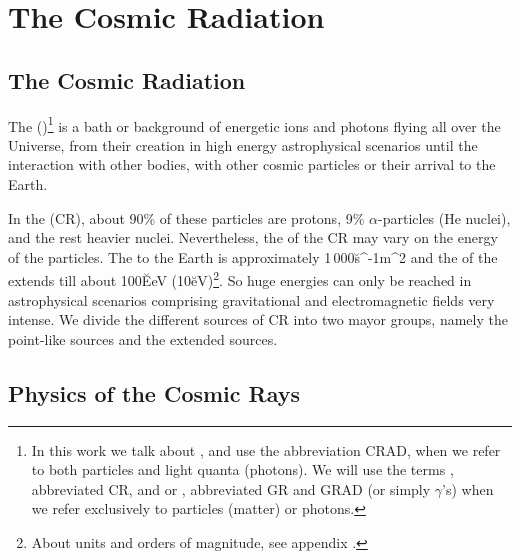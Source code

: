 

\chapter{The Cosmic Radiation}
\label{chapter:cosmicrad}
\let\rightmark\leftmark

\section{The Cosmic Radiation}

The \emph{} ()\footnote{In this work we
  talk about \emph{}, and use the abbreviation
  CRAD, when we refer to both particles and light quanta (photons). We
  will use the terms \emph{}, abbreviated CR, and
  \emph{} or \emph{}, abbreviated GR
  and GRAD (or simply $\gamma$'s) when we refer exclusively to
  particles (matter) or photons.}  is a bath or background of
energetic ions and photons flying all over the Universe, from their
creation in high energy astrophysical scenarios until the interaction
with other bodies, with other cosmic particles or their arrival to the
Earth.

In the \emph{} (CR), about 90\% of these particles are
protons, 9\% $\alpha$-particles (He nuclei), and the rest heavier
nuclei. Nevertheless, the  
of the CR may vary on the energy of the particles. The  to the Earth is approximately 1\,000\u{s^{-1}m^2} and the
 of the \emph{} extends till about
100\u{EeV} (10\u{eV})\footnote{About units and orders of
  magnitude, see appendix .}. So huge energies
can only be reached in astrophysical scenarios comprising
gravitational and electromagnetic fields very intense. We divide the
different sources of CR into two mayor groups, namely the point-like
sources and the extended sources.

\section{Physics of the Cosmic Rays}

